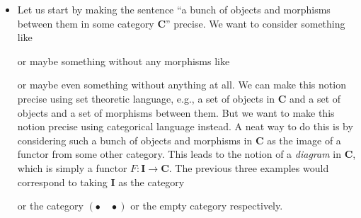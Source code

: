 \documentclass[12pt,a4paper]{amsart}
\theoremstyle{plain}
\theoremstyle{definition}
\theoremstyle{remark}
\begin{document}
\begin{itemize}
  \item Let us start by making the sentence ``a bunch of objects and morphisms between them in some category $\mathbf{C}$'' precise.
    We want to consider something like
    \begin{center}
    \end{center}
    or maybe something without any morphisms like
    \begin{center}
    \end{center}
    or maybe even something without anything at all.
    We can make this notion precise using set theoretic language, e.g., a set of objects in $\mathbf{C}$ and a set of objects and a set of morphisms between them.
    But we want to make this notion precise using categorical language instead.
    A neat way to do this is by considering such a bunch of objects and morphisms in $\mathbf{C}$ as the image of a functor from some other category.
    This leads to the notion of a \textit{diagram} in $\mathbf{C}$, which is simply a functor $F \colon \mathbf{I} \to \mathbf{C}$.
    The previous three examples would correspond to taking $\mathbf{I}$ as the category
    \begin{center}
    \end{center}
    or the category $(\bullet \quad \bullet)$ or the empty category respectively.


\end{itemize}
\end{document}
